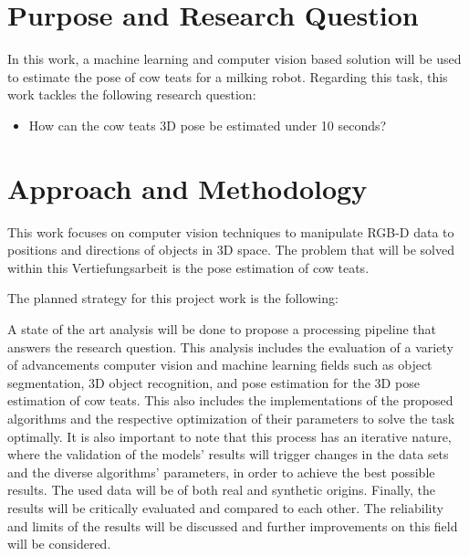 

\section{Purpose and Research Question}\label{chap:1:research-question}
In this work, a machine learning and computer vision based solution will be used to estimate the pose of cow teats for a milking robot. Regarding this task, this work tackles the following research question:
\begin{itemize}
    \item How can the cow teats 3D pose be estimated under 10 seconds?
\end{itemize}

\section{Approach and Methodology}\label{chap:1:approach-methodology}
This work focuses on computer vision techniques to manipulate RGB-D data to positions and directions of objects in 3D space. The problem that will be solved within this Vertiefungsarbeit is the pose estimation of cow teats.

The planned strategy for this project work is the following:

A state of the art analysis will be done to propose a processing pipeline that answers the research question. This analysis includes the evaluation of a variety of advancements computer vision and machine learning fields such as object segmentation, 3D object recognition, and pose estimation for the 3D pose estimation of cow teats. This also includes the implementations of the proposed algorithms and the respective optimization of their parameters to solve the task optimally. It is also important to note that this process has an iterative nature, where the validation of the models' results will trigger changes in the data sets and the diverse algorithms' parameters, in order to achieve the best possible results. The used data will be of both real and synthetic origins. Finally, the results will be critically evaluated and compared to each other. The reliability and limits of the results will be discussed and further improvements on this field will be considered. 


